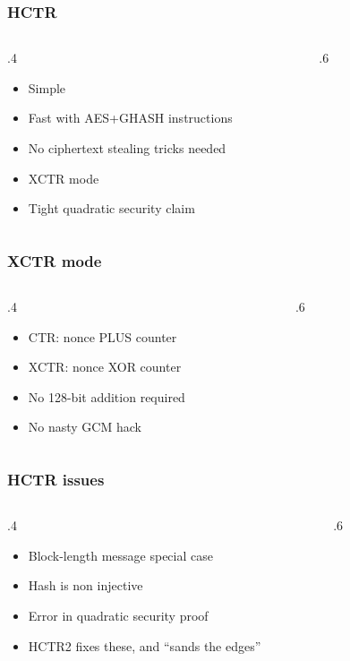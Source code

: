 \documentclass[aspectratio=169]{beamer}
\newenvironment*{figslide}{
    \begin{columns}
        \begin{column}{.4\textwidth}

}{
\end{column}
\begin{column}{.6\textwidth}
    \begin{figure}
        
    \end{figure}
\end{column}
\end{columns}
}
\begin{document}
\toggletrue{oldhctr}

\begin{frame}

\frametitle{HCTR}

    \begin{figslide}
        \begin{itemize}
            \item Simple
            \item Fast with AES+GHASH instructions
            \item No ciphertext stealing tricks needed
            \item XCTR mode
            \item Tight quadratic security claim
        \end{itemize}
    \end{figslide}
\end{frame}

\begin{frame}

    \frametitle{XCTR mode}
    
    \begin{figslide}
            \begin{itemize}
                \item CTR: nonce PLUS counter
                \item XCTR: nonce XOR counter
                \item No 128-bit addition required
                \item No nasty GCM hack
            \end{itemize}
    \end{figslide}
\end{frame}

\begin{frame}

\frametitle{HCTR issues}
\begin{figslide}
        \begin{itemize}
            \item Block-length message special case
            \item Hash is non injective
            \item Error in quadratic security proof
            \item HCTR2 fixes these, and ``sands the edges''
        \end{itemize}
\end{figslide}

\end{frame}
\end{document}
